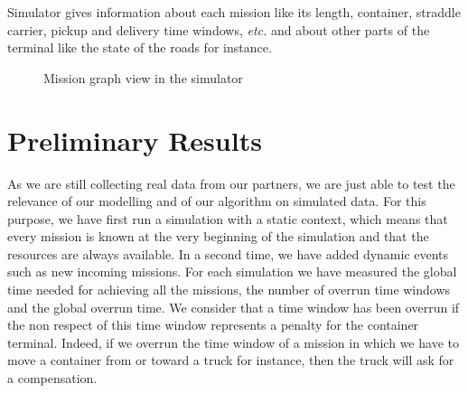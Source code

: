 \documentclass[journal]{IEEEtran}
\let\MYoriglatexcaption\caption
\renewcommand{\caption}[2][\relax]{\MYoriglatexcaption[#2]{#2}}
\begin{document}
Simulator gives information about each mission like its length, container,
straddle carrier, pickup and delivery time windows, \textit{etc.} and about other parts of the terminal like the state of the roads for instance.

\begin{figure}
	\caption{Mission graph view in the simulator}
	\label{acoview}
\end{figure}

\section{Preliminary Results}
As we are still collecting real data from our partners, we are just able to test the relevance of our modelling and of our algorithm on simulated data. For this purpose, we have first
run a simulation with a static context, which means that every mission is known at the very beginning of the simulation and that the resources are always
available. In a second time, we have added dynamic events such as new incoming missions. For each simulation we have measured the global time
needed for achieving all the missions, the number of overrun time windows and the global overrun time. %
We consider that a time window has been overrun if the non respect of this time window represents a penalty for the container terminal. Indeed, if we overrun the time window of a mission in which we have to move a container from or toward a truck for instance, then the truck will ask for a compensation.
\end{document}
